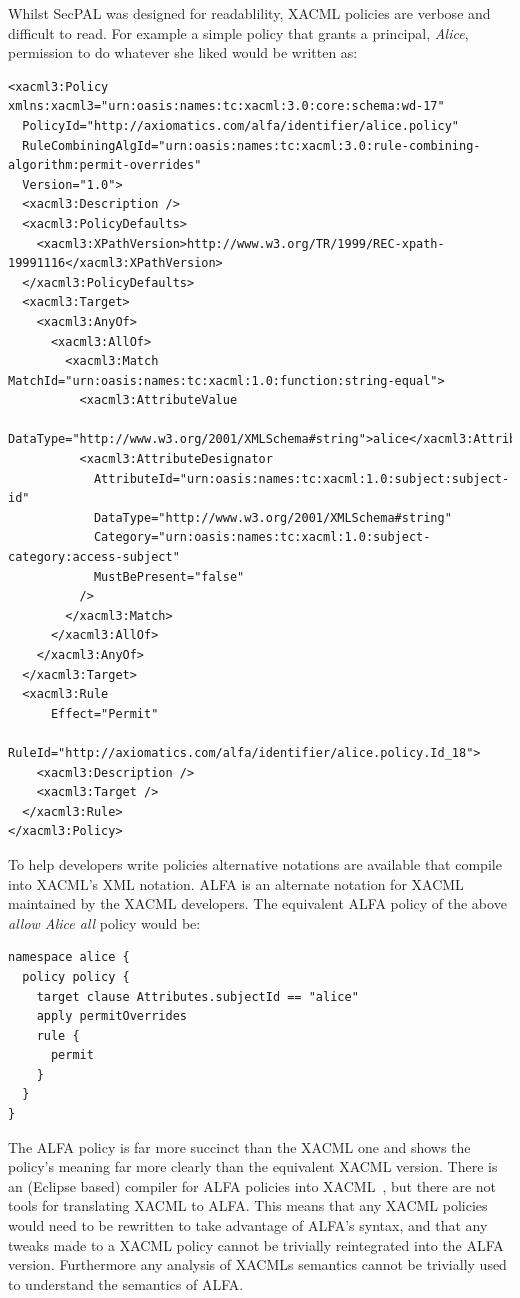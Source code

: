 \documentclass[thesis.tex]{subfiles}
\begin{document}
Whilst SecPAL was designed for readablility, XACML policies are verbose and
difficult to read. For example a simple policy that grants a principal,
\emph{Alice}, permission to do whatever she liked would be written as:

\begin{lstlisting}
<xacml3:Policy xmlns:xacml3="urn:oasis:names:tc:xacml:3.0:core:schema:wd-17"
  PolicyId="http://axiomatics.com/alfa/identifier/alice.policy"
  RuleCombiningAlgId="urn:oasis:names:tc:xacml:3.0:rule-combining-algorithm:permit-overrides"
  Version="1.0">
  <xacml3:Description />
  <xacml3:PolicyDefaults>
    <xacml3:XPathVersion>http://www.w3.org/TR/1999/REC-xpath-19991116</xacml3:XPathVersion>
  </xacml3:PolicyDefaults>
  <xacml3:Target>
    <xacml3:AnyOf>
      <xacml3:AllOf>
        <xacml3:Match MatchId="urn:oasis:names:tc:xacml:1.0:function:string-equal">
          <xacml3:AttributeValue
            DataType="http://www.w3.org/2001/XMLSchema#string">alice</xacml3:AttributeValue>
          <xacml3:AttributeDesignator 
            AttributeId="urn:oasis:names:tc:xacml:1.0:subject:subject-id"
            DataType="http://www.w3.org/2001/XMLSchema#string"
            Category="urn:oasis:names:tc:xacml:1.0:subject-category:access-subject"
            MustBePresent="false"
          />
        </xacml3:Match>
      </xacml3:AllOf>
    </xacml3:AnyOf>
  </xacml3:Target>
  <xacml3:Rule 
      Effect="Permit"
      RuleId="http://axiomatics.com/alfa/identifier/alice.policy.Id_18">
    <xacml3:Description />
    <xacml3:Target />
  </xacml3:Rule>
</xacml3:Policy>
\end{lstlisting}

To help developers write policies alternative notations are available that
compile into XACML's XML notation. ALFA is an alternate notation for
XACML~\cite{oasis_xacml_technical_comitee_abbreviated_2015} maintained by the
XACML developers. The equivalent ALFA policy of the above \emph{allow Alice all}
policy would be:

\begin{lstlisting}
namespace alice {
  policy policy {
    target clause Attributes.subjectId == "alice"
    apply permitOverrides
    rule {
      permit
    }
  }
}
\end{lstlisting}

The ALFA policy is far more succinct than the XACML one and shows the
policy's meaning far more clearly than the equivalent XACML version.
There is an (Eclipse based) compiler for ALFA policies into
XACML~\cite{axiomaics_axiomatics_2012}, but there are not tools for
translating XACML to ALFA.  This means that any XACML policies would
need to be rewritten to take advantage of ALFA's syntax, and that any
tweaks made to a XACML policy cannot be trivially reintegrated into
the ALFA version.  Furthermore any analysis of XACMLs semantics cannot
be trivially used to understand the semantics of ALFA.
\end{document}
